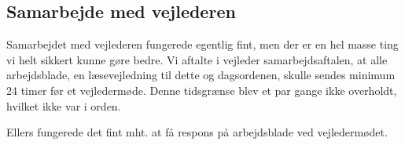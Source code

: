\subsection{Samarbejde med vejlederen}

Samarbejdet med vejlederen fungerede egentlig fint, men der er en hel masse ting vi helt sikkert kunne gøre bedre. Vi aftalte i vejleder samarbejdsaftalen, at alle arbejdsblade, en læsevejledning til dette og dagsordenen, skulle sendes minimum 24 timer før et vejledermøde. Denne tidsgrænse blev et par gange ikke overholdt, hvilket ikke var i orden. 



Ellers fungerede det fint mht. at få respons på arbejdsblade ved vejledermødet.